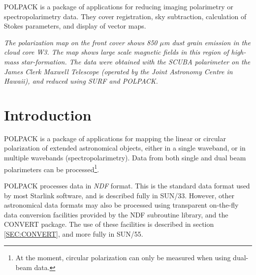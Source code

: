 \documentclass[twoside,11pt]{article}
\newcommand{\stardocinitials}  {SUN}
\newcommand{\stardocnumber}    {223.7}
\newcommand{\stardocabstract}  {POLPACK is a package of applications for 
reducing imaging polarimetry or spectropolarimetry data. They cover 
registration, sky subtraction, calculation of Stokes parameters, and 
display of vector maps.}
\newcommand{\stardocname}{\stardocinitials /\stardocnumber}
\newcommand{\hyperref}[4]{#2\ref{#4}#3}
\newenvironment{latexonly}{}{}
\newcommand{\xref}[3]{#1}
\newcommand{\xlabel}[1]{}
\renewcommand{\_}{\texttt{\symbol{95}}}
\renewcommand{\thepage}{\roman{page}}
\begin{document}
\stardocabstract

\begin{latexonly}
\newpage
\begin{center}
\vspace*{3in}
\parbox{5in}{
{\large
\emph{The polarization map on the front cover shows 850 $\mu$m dust grain 
emission in the cloud core W3. The map shows large scale magnetic fields
in this region of high-mass star-formation. The data were obtained with
the SCUBA polarimeter on the James Clerk Maxwell Telescope  (operated by 
the Joint Astronomy Centre in Hawaii), and reduced using SURF and POLPACK.
}}}
\end{center}
\end{latexonly}

  \newpage
  \begin{latexonly}
    \setlength{\parskip}{0mm}
    \tableofcontents
    \setlength{\parskip}{\medskipamount}
    \markboth{\stardocname}{\stardocname}
  \end{latexonly}
\cleardoublepage
\renewcommand{\thepage}{\arabic{page}}
\setcounter{page}{1}

\section{\xlabel{introduction}Introduction}
POLPACK is a package of applications for mapping the linear or circular
polarization of extended astronomical objects, either in a single
waveband, or in multiple wavebands (spectropolarimetry). Data from both
single and dual beam polarimeters can be processed\footnote{At the
moment, circular polarization can only be measured when using dual-beam
data.}.

POLPACK processes data in \emph{NDF} format. This is the standard data
format used by most Starlink software, and is described fully in
\xref{SUN/33}{sun33}{}. However, other astronomical data formats may also
be processed using transparent on-the-fly data conversion facilities
provided by the NDF subroutine library, and the CONVERT package. The use of 
these facilities is described \hyperref{here}{in section }{}{SEC:CONVERT},
and more fully in \xref{SUN/55}{sun55}{}.
\end{document}
